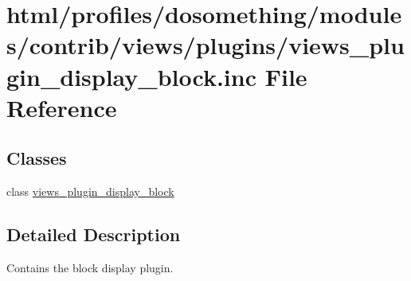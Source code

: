 \hypertarget{views__plugin__display__block_8inc}{
\section{html/profiles/dosomething/modules/contrib/views/plugins/views\_\-plugin\_\-display\_\-block.inc File Reference}
\label{views__plugin__display__block_8inc}
}
\subsection*{Classes}
\begin{DoxyCompactItemize}
\item 
class \hyperlink{classviews__plugin__display__block}{views\_\-plugin\_\-display\_\-block}
\end{DoxyCompactItemize}


\subsection{Detailed Description}
Contains the block display plugin. 